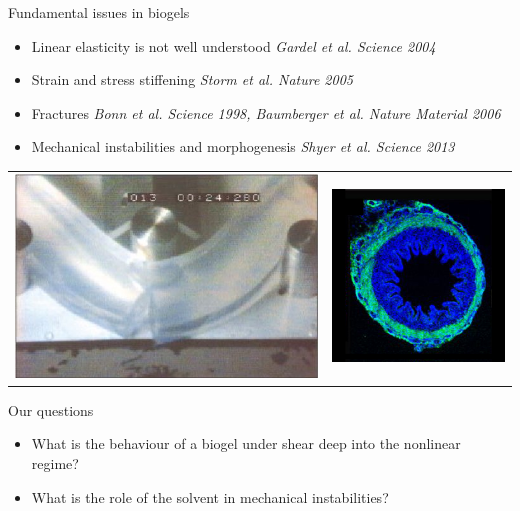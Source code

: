 \documentclass[xcolor=table]{beamer}
\begin{document}
\begin{frame}{Fundamental issues in biogels}
\begin{itemize}
\item Linear elasticity is not well understood \textit{\scriptsize Gardel et al. Science 2004}
\item Strain and stress stiffening \textit{\scriptsize Storm et al. Nature 2005}
\item Fractures \textit{\scriptsize Bonn et al. Science 1998, Baumberger et al. Nature Material 2006}
\item Mechanical instabilities and morphogenesis \textit{\scriptsize Shyer et al. Science 2013}
\end{itemize}
\begin{tabu}{X[c]X[c]}
\includegraphics[height=6\baselineskip]{Bonn_fracture} &
\includegraphics[height=6\baselineskip]{Villi_sq}
\end{tabu}
\begin{block}{Our questions}
\begin{itemize}
\item What is the behaviour of a biogel under shear deep into the nonlinear regime?
\item What is the role of the solvent in mechanical instabilities?
\end{itemize}
\end{block}
\end{frame}
\end{document}

